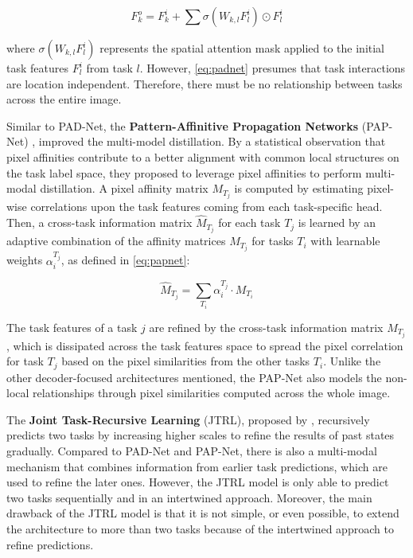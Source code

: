 \begin{equation}
\label{eq:padnet}
F_k^o = F_k^i + \sum {\sigma (W_{k,l}F_l^i) \odot F_l^i}
\end{equation}

\noindent where $\sigma (W_{k,l}F_l^i)$ represents the spatial attention mask applied to the initial task features $F_l^i$ from task $l$. However, \autoref{eq:padnet} presumes that task interactions are location independent. Therefore, there must be no relationship between tasks across the entire image.

Similar to PAD-Net, the \textbf{Pattern-Affinitive Propagation Networks} (PAP-Net) \citep{zhang2019pattern}, improved the multi-model distillation. By a statistical observation that pixel affinities contribute to a better alignment with common local structures on the task label space, they proposed to leverage pixel affinities to perform multi-modal distillation. A pixel affinity matrix $M_{T_j}$ is computed by estimating pixel-wise correlations upon the task features coming from each task-specific head. Then, a cross-task information matrix $\hat{M}_{T_j}$ for each task $T_j$ is learned by an adaptive combination of the affinity matrices $M_{T_j}$ for tasks $T_i$ with learnable weights $\alpha_i^{T_j}$, as defined in \autoref{eq:papnet}:

\begin{equation}
\label{eq:papnet}
\hat{M}_{T_j} = \sum_{T_i} {\alpha_i^{T_j} \cdot M_{T_i}}
\end{equation}

The task features of a task $j$ are refined by the cross-task information matrix $M_{T_j}$, which is dissipated across the task features space to spread the pixel correlation for task $T_j$ based on the pixel similarities from the other tasks $T_i$. Unlike the other decoder-focused architectures mentioned, the PAP-Net also models the non-local relationships through pixel similarities computed across the whole image.

The \textbf{Joint Task-Recursive Learning} (JTRL), proposed by \cite{zhang2018joint}, recursively predicts two tasks by increasing higher scales to refine the results of past states gradually. Compared to PAD-Net and PAP-Net, there is also a multi-modal mechanism that combines information from earlier task predictions, which are used to refine the later ones. However, the JTRL model is only able to predict two tasks sequentially and in an intertwined approach. Moreover, the main drawback of the JTRL model is that it is not simple, or even possible, to extend the architecture to more than two tasks because of the intertwined approach to refine predictions.

